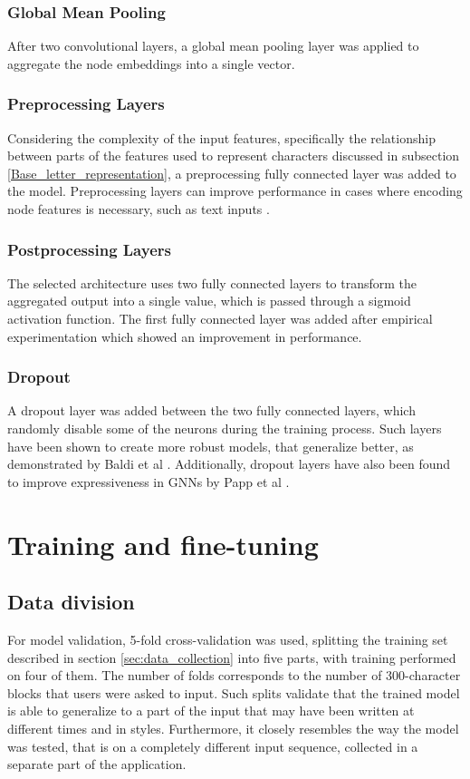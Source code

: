 \subsubsection{Global Mean Pooling}
After two convolutional layers, a global mean pooling layer was applied to aggregate the node embeddings into a single vector. 


\subsubsection{Preprocessing Layers}
Considering the complexity of the input features, specifically the relationship between parts of the features used to represent characters discussed in subsection \ref{Base_letter_representation}, a preprocessing fully connected layer was added to the model. Preprocessing layers can improve performance in cases where encoding node features is necessary, such as text inputs \cite{Lesk2024}.

\subsubsection{Postprocessing Layers}
The selected architecture uses two fully connected layers to transform the aggregated output into a single value, 
which is passed through a sigmoid activation function. The first fully connected layer was added after empirical experimentation which showed an improvement in performance.


\subsubsection{Dropout}
A dropout layer was added between the two fully connected layers, which randomly disable some of the neurons during the training process. Such layers have been shown to create more robust models, that generalize better, as demonstrated by Baldi et al \cite{NIPS2013_71f6278d}. Additionally, dropout layers have also been found to improve expressiveness in GNNs by Papp et al \cite{NEURIPS2021_b8b2926b}.

\section{Training and fine-tuning}

\subsection{Data division}
For model validation, 5-fold cross-validation was used, splitting the training set described in section \ref{sec:data_collection} into five parts, with training performed on four of them. The number of folds corresponds to the number of 300-character blocks that users were asked to input. Such splits validate that the trained model is able to generalize to a part of the input that may have been written at different times and in styles. Furthermore, it closely resembles the way the model was tested, that is on a completely different input sequence, collected in a separate part of the application.  

